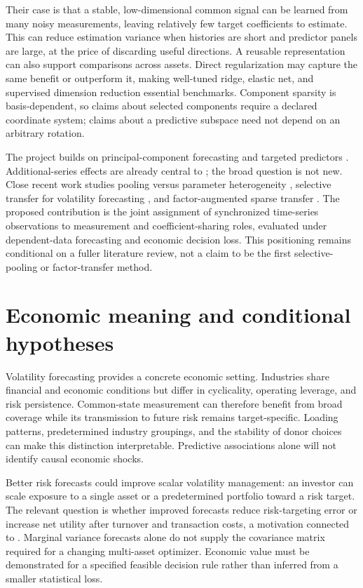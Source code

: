 \documentclass[11pt]{article}
\begin{document}
Their case is that a stable, low-dimensional common signal can be learned from many noisy measurements, leaving relatively few target coefficients to estimate. This can reduce estimation variance when histories are short and predictor panels are large, at the price of discarding useful directions. A reusable representation can also support comparisons across assets. Direct regularization may capture the same benefit or outperform it, making well-tuned ridge, elastic net, and supervised dimension reduction essential benchmarks. Component sparsity is basis-dependent, so claims about selected components require a declared coordinate system; claims about a predictive subspace need not depend on an arbitrary rotation.

The project builds on principal-component forecasting \citep{stockwatson2002} and targeted predictors \citep{baing2008}. Additional-series effects are already central to \citet{boivinng2006}; the broad question is not new. Close recent work studies pooling versus parameter heterogeneity \citep{pesaranetal2026}, selective transfer for volatility forecasting \citep{telleretal2026}, and factor-augmented sparse transfer \citep{fujiang2025}. The proposed contribution is the joint assignment of synchronized time-series observations to measurement and coefficient-sharing roles, evaluated under dependent-data forecasting and economic decision loss. This positioning remains conditional on a fuller literature review, not a claim to be the first selective-pooling or factor-transfer method.

\section{Economic meaning and conditional hypotheses}
Volatility forecasting provides a concrete economic setting. Industries share financial and economic conditions but differ in cyclicality, operating leverage, and risk persistence. Common-state measurement can therefore benefit from broad coverage while its transmission to future risk remains target-specific. Loading patterns, predetermined industry groupings, and the stability of donor choices can make this distinction interpretable. Predictive associations alone will not identify causal economic shocks.

Better risk forecasts could improve scalar volatility management: an investor can scale exposure to a single asset or a predetermined portfolio toward a risk target. The relevant question is whether improved forecasts reduce risk-targeting error or increase net utility after turnover and transaction costs, a motivation connected to \citet{moreiramuir2017}. Marginal variance forecasts alone do not supply the covariance matrix required for a changing multi-asset optimizer. Economic value must be demonstrated for a specified feasible decision rule rather than inferred from a smaller statistical loss.
\end{document}
